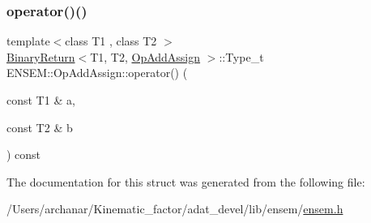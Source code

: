 \mbox{\label{structENSEM_1_1OpAddAssign_a115e2f2eb7eaf306b7af0ad00e7801b8}} 
\subsubsection{\texorpdfstring{operator()()}{operator()()}\hspace{0.1cm}{\footnotesize\ttfamily [2/2]}}
{\footnotesize\ttfamily template$<$class T1 , class T2 $>$ \\
\mbox{\hyperlink{structENSEM_1_1BinaryReturn}{Binary\+Return}}$<$T1, T2, \mbox{\hyperlink{structENSEM_1_1OpAddAssign}{Op\+Add\+Assign}} $>$\+::Type\+\_\+t E\+N\+S\+E\+M\+::\+Op\+Add\+Assign\+::operator() (\begin{DoxyParamCaption}\item[{const T1 \&}]{a,  }\item[{const T2 \&}]{b }\end{DoxyParamCaption}) const\hspace{0.3cm}{\ttfamily [inline]}}



The documentation for this struct was generated from the following file\+:\begin{DoxyCompactItemize}
\item 
/\+Users/archanar/\+Kinematic\+\_\+factor/adat\+\_\+devel/lib/ensem/\mbox{\hyperlink{lib_2ensem_2ensem_8h}{ensem.\+h}}\end{DoxyCompactItemize}
